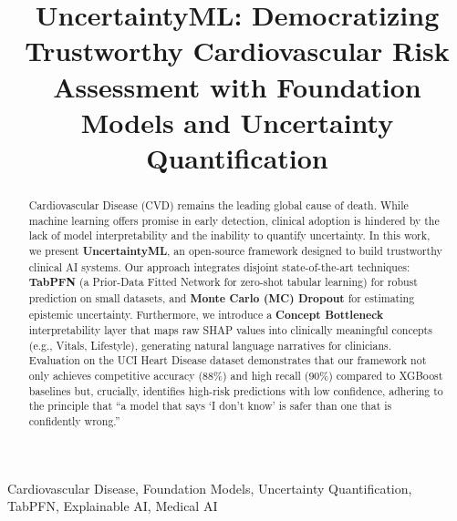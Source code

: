 \documentclass[conference]{IEEEtran}
\begin{document}
\title{UncertaintyML: Democratizing Trustworthy Cardiovascular Risk Assessment with Foundation Models and Uncertainty Quantification}

\author{
}

\maketitle

\begin{abstract}
Cardiovascular Disease (CVD) remains the leading global cause of death. While machine learning offers promise in early detection, clinical adoption is hindered by the lack of model interpretability and the inability to quantify uncertainty. In this work, we present \textbf{UncertaintyML}, an open-source framework designed to build trustworthy clinical AI systems. Our approach integrates disjoint state-of-the-art techniques: \textbf{TabPFN} (a Prior-Data Fitted Network for zero-shot tabular learning) for robust prediction on small datasets, and \textbf{Monte Carlo (MC) Dropout} for estimating epistemic uncertainty. Furthermore, we introduce a \textbf{Concept Bottleneck} interpretability layer that maps raw SHAP values into clinically meaningful concepts (e.g., Vitals, Lifestyle), generating natural language narratives for clinicians. Evaluation on the UCI Heart Disease dataset demonstrates that our framework not only achieves competitive accuracy (88\%) and high recall (90\%) compared to XGBoost baselines but, crucially, identifies high-risk predictions with low confidence, adhering to the principle that ``a model that says `I don't know' is safer than one that is confidently wrong.''
\end{abstract}

\begin{IEEEkeywords}
Cardiovascular Disease, Foundation Models, Uncertainty Quantification, TabPFN, Explainable AI, Medical AI
\end{IEEEkeywords}
\end{document}
